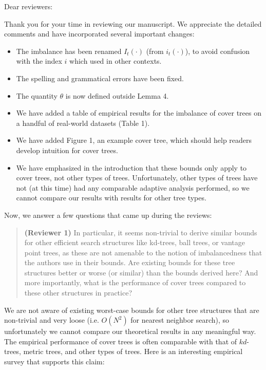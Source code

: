 \documentclass[10pt]{article} %
\begin{document}
Dear reviewers:

Thank you for your time in reviewing our manuscript.  We appreciate the detailed
comments and have incorporated several important changes:

\begin{itemize}
  \item The imbalance has been renamed $I_t(\cdot)$ (from $i_t(\cdot)$), to
avoid confusion with the index $i$ which used in other contexts.

  \item The spelling and grammatical errors have been fixed.

  \item The quantity $\theta$ is now defined outside Lemma 4.

  \item We have added a table of empirical results for the imbalance of cover
trees on a handful of real-world datasets (Table 1).

  \item We have added Figure 1, an example cover tree, which should help readers
develop intuition for cover trees.

  \item We have emphasized in the introduction that these bounds only apply to
cover trees, not other types of trees.  Unfortunately, other types of trees have
not (at this time) had any comparable adaptive analysis performed, so we cannot
compare our results with results for other tree types.
\end{itemize}

Now, we answer a few questions that came up during the reviews:

\begin{quote}
{\bf (Reviewer 1)} In particular, it seems non-trivial to derive similar bounds
for other efficient search structures like kd-trees, ball trees, or vantage
point trees, as these are not amenable to the notion of imbalancedness that the
authors use in their bounds. Are existing bounds for these tree structures
better or worse (or similar) than the bounds derived here? And more importantly,
what is the performance of cover trees compared to these other structures in
practice?
\end{quote}

We are not aware of existing worst-case bounds for other tree structures that
are non-trivial and very loose (i.e. $O(N^2)$ for nearest neighbor search), so
unfortunately we cannot compare our theoretical results in any meaningful way.
The empirical performance of cover trees is often comparable with that of
$kd$-trees, metric trees, and other types of trees.  Here is an interesting
empirical survey that supports this claim:
\end{document}

